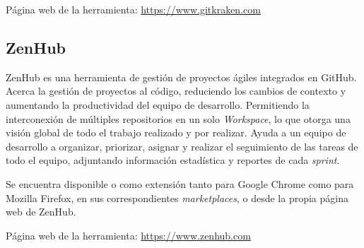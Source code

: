 Página web de la herramienta: \url{https://www.gitkraken.com}

\subsection{ZenHub}
ZenHub es una herramienta de gestión de proyectos ágiles integrados en GitHub. Acerca la gestión de proyectos al código, reduciendo los cambios de contexto y aumentando la productividad del equipo de desarrollo. Permitiendo la interconexión de múltiples repositorios en un solo \textit{Workspace}, lo que otorga una visión global de todo el trabajo realizado y por realizar. Ayuda a un equipo de desarrollo a organizar, priorizar, asignar y realizar el seguimiento de las tareas de todo el equipo, adjuntando información estadística y reportes de cada \textit{sprint}.

Se encuentra disponible o como extensión tanto para Google Chrome como para Mozilla Firefox, en sus correspondientes \textit{marketplaces}, o desde la propia página web de ZenHub.

Página web de la herramienta: \url{https://www.zenhub.com}